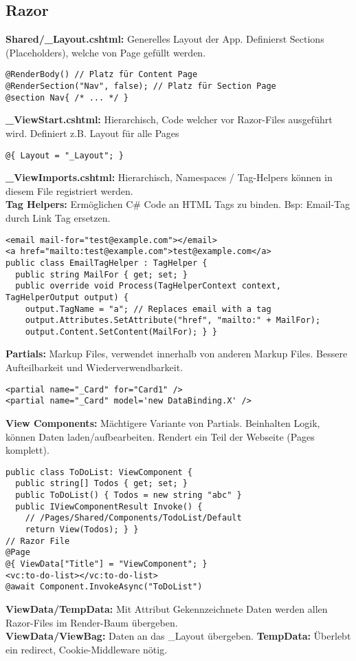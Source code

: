 \subsection{Razor}
\textcolor{b}{\textbf{Shared/\_Layout.cshtml:}} Generelles Layout der App. Definierst Sections (Placeholders), welche von Page gefüllt werden.
\begin{lstlisting}[style=csh]
@RenderBody() // Platz für Content Page
@RenderSection("Nav", false); // Platz für Section Page
@section Nav{ /* ... */ }
\end{lstlisting}
\textcolor{b}{\textbf{\_ViewStart.cshtml:}} Hierarchisch, Code welcher vor Razor-Files ausgeführt wird. Definiert z.B. Layout für alle Pages
\begin{lstlisting}[style=csh]
@{ Layout = "_Layout"; }
\end{lstlisting}
\textcolor{b}{\textbf{\_ViewImports.cshtml:}} Hierarchisch, Namespaces / Tag-Helpers können in diesem File registriert werden.\\
\textcolor{b}{\textbf{Tag Helpers:}} Ermöglichen C\# Code an HTML Tags zu binden. Bsp: Email-Tag durch Link Tag ersetzen.
\begin{lstlisting}[style=csh]
<email mail-for="test@example.com"></email>
<a href="mailto:test@example.com">test@example.com</a>
public class EmailTagHelper : TagHelper {
  public string MailFor { get; set; }
  public override void Process(TagHelperContext context, TagHelperOutput output) {
    output.TagName = "a"; // Replaces email with a tag
    output.Attributes.SetAttribute("href", "mailto:" + MailFor);
    output.Content.SetContent(MailFor); } }
\end{lstlisting}
\textcolor{b}{\textbf{Partials:}} Markup Files, verwendet innerhalb von anderen Markup Files. Bessere Aufteilbarkeit und Wiederverwendbarkeit.
\begin{lstlisting}[style=csh]
<partial name="_Card" for="Card1" />
<partial name="_Card" model='new DataBinding.X' />
\end{lstlisting}
\textcolor{b}{\textbf{View Components:}} Mächtigere Variante von Partials. Beinhalten Logik, können Daten laden/aufbearbeiten. Rendert ein Teil der Webseite (Pages komplett).
\begin{lstlisting}[style=csh]
public class ToDoList: ViewComponent {
  public string[] Todos { get; set; }
  public ToDoList() { Todos = new string "abc" }
  public IViewComponentResult Invoke() {
    // /Pages/Shared/Components/TodoList/Default
    return View(Todos); } }
// Razor File
@Page
@{ ViewData["Title"] = "ViewComponent"; }
<vc:to-do-list></vc:to-do-list>
@await Component.InvokeAsync("ToDoList")
\end{lstlisting}
\textcolor{b}{\textbf{ViewData/TempData:}} Mit Attribut Gekennzeichnete Daten werden allen Razor-Files im Render-Baum übergeben.\\
\textbf{ViewData/ViewBag:} Daten an das \_Layout übergeben. \textbf{TempData:} Überlebt ein redirect, Cookie-Middleware nötig.
